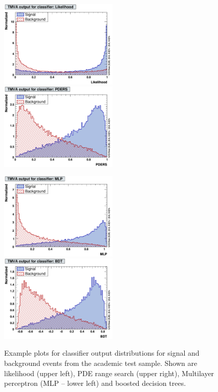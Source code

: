 \begin{figure}[t]
\begin{center}
  \includegraphics[width=0.50\textwidth]{plots/MVA-Likelihood}
  \hspace{-0.3cm}
  \includegraphics[width=0.50\textwidth]{plots/MVA-PDERS}

  \vspace{0.2cm}

  \includegraphics[width=0.50\textwidth]{plots/MVA-MLP}
  \hspace{-0.3cm}
  \includegraphics[width=0.50\textwidth]{plots/MVA-BDT}
\end{center}
\vspace{-0.5cm}
\caption[.]{Example plots for classifier output distributions for signal and
            background events from the academic test sample. Shown are
            likelihood (upper left), PDE range search
            (upper right), Multilayer perceptron (MLP -- lower left) and boosted decision trees.}
\label{fig:usingtmva:mvas}
\end{figure}
